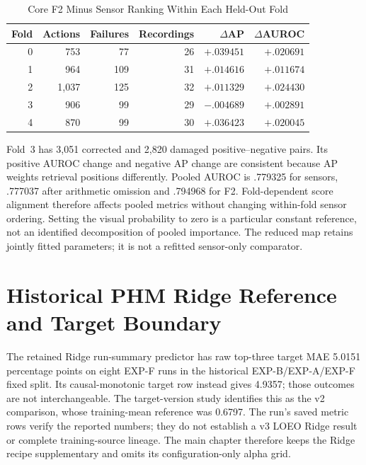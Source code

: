 \begin{table}[htbp]
\caption{Core F2 Minus Sensor Ranking Within Each Held-Out Fold}\label{tab:f2-fold-audit}
\centering\small
\begin{tabular}{rrrrrr}\toprule
Fold & Actions & Failures & Recordings & $\Delta$AP & $\Delta$AUROC\\\midrule
0 & 753 & 77 & 26 & $+.039451$ & $+.020691$\\
1 & 964 & 109 & 31 & $+.014616$ & $+.011674$\\
2 & 1,037 & 125 & 32 & $+.011329$ & $+.024430$\\
3 & 906 & 99 & 29 & $-.004689$ & $+.002891$\\
4 & 870 & 99 & 30 & $+.036423$ & $+.020045$\\\bottomrule
\end{tabular}
\end{table}
Fold~3 has 3,051 corrected and 2,820 damaged positive--negative pairs. Its positive
AUROC change and negative AP change are consistent because AP weights retrieval
positions differently. Pooled AUROC is .779325 for sensors, .777037 after arithmetic
omission and .794968 for F2. Fold-dependent score alignment therefore affects pooled
metrics without changing within-fold sensor ordering. Setting the visual probability to
zero is a particular constant reference, not an identified decomposition of pooled
importance. The reduced map retains jointly fitted parameters; it is not a refitted
sensor-only comparator.

\section{Historical PHM Ridge Reference and Target Boundary}
\label{sec:phm-ridge-supplement}
The retained Ridge run-summary predictor has raw top-three target MAE 5.0151 percentage
points on eight EXP-F runs in the historical EXP-B/EXP-A/EXP-F fixed split. Its
causal-monotonic target row instead gives 4.9357; those outcomes are not interchangeable.
The target-version study identifies this as the v2 comparison, whose training-mean
reference was 0.6797. The run's saved metric rows verify the reported numbers; they do
not establish a v3 LOEO Ridge result or complete training-source lineage. The main
chapter therefore keeps the Ridge recipe supplementary and omits its configuration-only
alpha grid.


